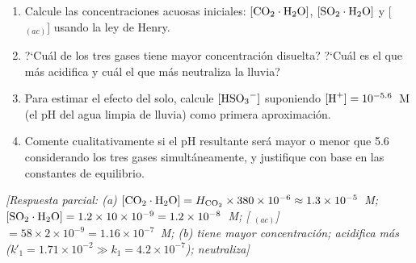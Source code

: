 \begin{bloque_ejercicios}
\begin{ejercicios}
\begin{enumerate}[label=\alph*)]
    \item Calcule las concentraciones acuosas iniciales:
          $[\ce{CO2}\cdot\ce{H2O}]$, $[\ce{SO2}\cdot\ce{H2O}]$
          y [$_{(ac)}$] usando la ley de Henry.
    \item ?`Cu\'al de los tres gases tiene mayor concentraci\'on
          disuelta? ?`Cu\'al es el que m\'as acidifica y cu\'al
          el que m\'as neutraliza la lluvia?
    \item Para estimar el efecto del  solo, calcule
          $[\ce{HSO3^-}]$ suponiendo $[\ce{H^+}] = 10^{-5.6}$~M
          (el pH del agua limpia de lluvia) como primera
          aproximaci\'on.
    \item Comente cualitativamente si el pH resultante ser\'a
          mayor o menor que 5.6 considerando los tres gases
          simult\'aneamente, y justifique con base en las
          constantes de equilibrio.
\end{enumerate}

\textit{[Respuesta parcial:
(a) $[\ce{CO2}\cdot\ce{H2O}]
    = H_{\ce{CO2}}\times380\times10^{-6}
    \approx 1.3\times10^{-5}$~M;
    $[\ce{SO2}\cdot\ce{H2O}]
    = 1.2\times10\times10^{-9} = 1.2\times10^{-8}$~M;
   [ $_{(ac)}$] $= 58\times2\times10^{-9}
    = 1.16\times10^{-7}$~M;
(b)  tiene mayor concentraci\'on;
     acidifica m\'as (k$'_1 = 1.71\times10^{-2}
    \gg k_1 = 4.2\times10^{-7}$);  neutraliza]}

\end{ejercicios}

\end{bloque_ejercicios}

